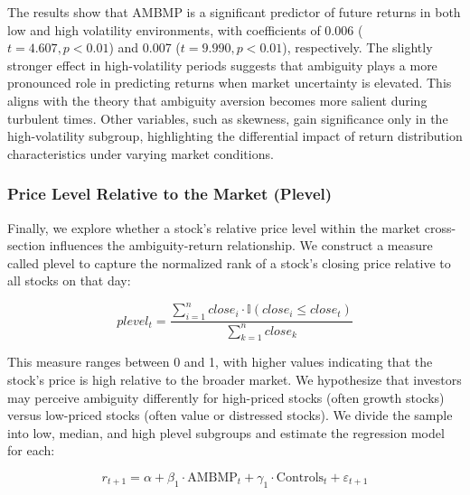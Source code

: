 \documentclass[preprint,12pt,authoryear]{elsarticle}
\begin{document}
The results show that AMBMP is a significant predictor of future returns in both low and high volatility environments, with coefficients of 0.006 ($t = 4.607, p < 0.01$) and 0.007 ($t = 9.990, p < 0.01$), respectively. The slightly stronger effect in high-volatility periods suggests that ambiguity plays a more pronounced role in predicting returns when market uncertainty is elevated. This aligns with the theory that ambiguity aversion becomes more salient during turbulent times. Other variables, such as skewness, gain significance only in the high-volatility subgroup, highlighting the differential impact of return distribution characteristics under varying market conditions.

\subsubsection{Price Level Relative to the Market (Plevel)} \label{subsec:price_level}

Finally, we explore whether a stock's relative price level within the market cross-section influences the ambiguity-return relationship. We construct a measure called plevel to capture the normalized rank of a stock's closing price relative to all stocks on that day:

\begin{equation}
plevel_t = \frac{\sum_{i=1}^n close_i \cdot \mathbb{I}(close_i \leq close_t)}{\sum_{k=1}^n close_k}
\end{equation}

This measure ranges between 0 and 1, with higher values indicating that the stock's price is high relative to the broader market. We hypothesize that investors may perceive ambiguity differently for high-priced stocks (often growth stocks) versus low-priced stocks (often value or distressed stocks). We divide the sample into low, median, and high plevel subgroups and estimate the regression model for each:

\begin{equation}
r_{t+1} = \alpha + \beta_1 \cdot \mathrm{AMBMP}_t + \gamma_1 \cdot \mathrm{Controls}_t + \varepsilon_{t+1}
\end{equation}
\end{document}

